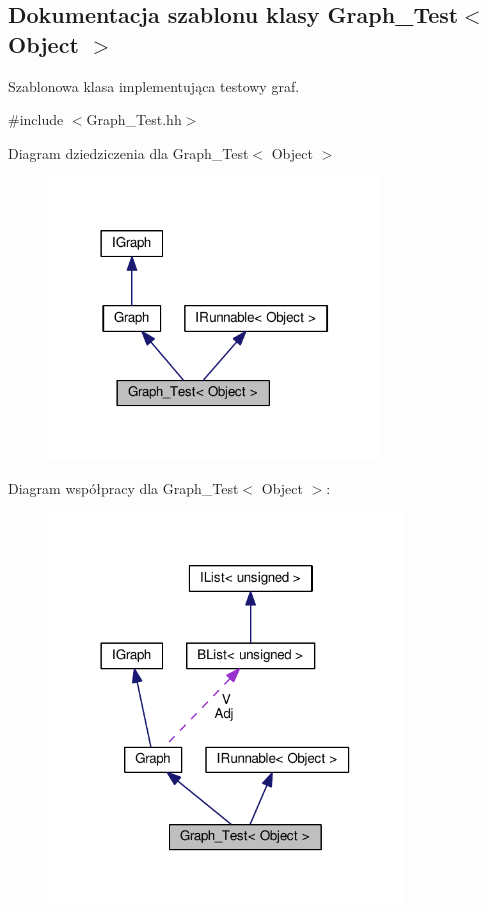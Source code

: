 \hypertarget{class_graph___test}{\subsection{Dokumentacja szablonu klasy Graph\-\_\-\-Test$<$ Object $>$}
\label{class_graph___test}
}


Szablonowa klasa implementująca testowy graf.  




{\ttfamily \#include $<$Graph\-\_\-\-Test.\-hh$>$}



Diagram dziedziczenia dla Graph\-\_\-\-Test$<$ Object $>$
\nopagebreak
\begin{figure}[H]
\begin{center}
\leavevmode
\includegraphics[width=249pt]{class_graph___test__inherit__graph}
\end{center}
\end{figure}


Diagram współpracy dla Graph\-\_\-\-Test$<$ Object $>$\-:
\nopagebreak
\begin{figure}[H]
\begin{center}
\leavevmode
\includegraphics[width=266pt]{class_graph___test__coll__graph}
\end{center}
\end{figure}
